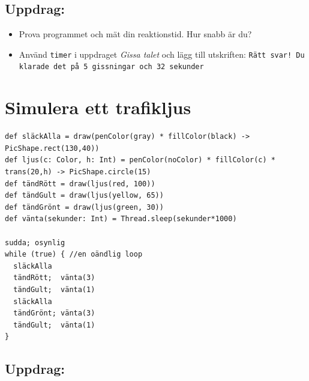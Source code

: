 \section*{\color{BrickRed}Uppdrag:}


\begin{itemize}

\item {Prova programmet och mät din reaktionstid. Hur snabb är du?}
\item {Använd \lstinline{timer} i uppdraget {\it Gissa talet} och lägg till utskriften: \lstinline{Rätt svar! Du klarade det på 5 gissningar och 32 sekunder}}

\end{itemize}


\chapter{Simulera ett trafikljus}
  

\begin{lstlisting}[basicstyle={\ttfamily\fontsize{14}{17}\selectfont},numbers=none]
def släckAlla = draw(penColor(gray) * fillColor(black) -> PicShape.rect(130,40))
def ljus(c: Color, h: Int) = penColor(noColor) * fillColor(c) * trans(20,h) -> PicShape.circle(15)
def tändRött = draw(ljus(red, 100))
def tändGult = draw(ljus(yellow, 65))
def tändGrönt = draw(ljus(green, 30))
def vänta(sekunder: Int) = Thread.sleep(sekunder*1000)

sudda; osynlig  
while (true) { //en oändlig loop
  släckAlla
  tändRött;  vänta(3)
  tändGult;  vänta(1) 
  släckAlla
  tändGrönt; vänta(3)
  tändGult;  vänta(1)
}
\end{lstlisting}
        
\section*{\color{BrickRed}Uppdrag:}


